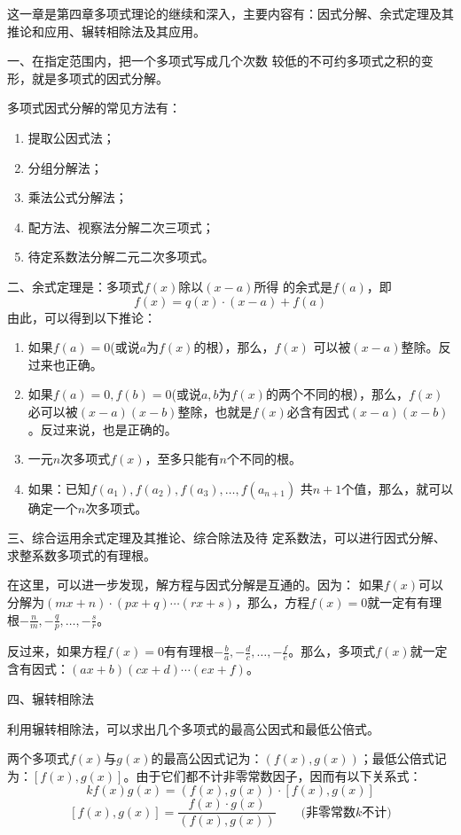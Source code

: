 这一章是第四章多项式理论的继续和深入，主要内容有：因式分解、余式定理及其推论和应用、辗转相除法及其应用。

一、在指定范围内，把一个多项式写成几个次数
较低的不可约多项式之积的变形，就是多项式的因式分解。

多项式因式分解的常见方法有：
\begin{enumerate}
    \item 提取公因式法；
    \item 分组分解法；
    \item 乘法公式分解法；
    \item 配方法、视察法分解二次三项式；
    \item 待定系数法分解二元二次多项式。
\end{enumerate} 

二、余式定理是：多项式$f(x)$除以$(x-a)$所得
的余式是$f(a)$，即
\[f (x) =q (x) \cdot (x-a) +f (a) \]
由此，可以得到以下推论：
\begin{enumerate}
\item 如果$f(a)=0$(或说$a$为$f(x)$的根），那么，$f(x)$
可以被$(x-a)$整除。反过来也正确。
\item 如果$f(a)=0,f(b)=0$(或说$a,b$为$f(x)$的两个不同的根），那么，$f(x)$必可以被$(x-a)(x-b)$整除，也就是$f(x)$必含有因式$(x-a)(x-b)$。反过来说，也是正确的。
\item 一元$n$次多项式$f(x)$，至多只能有$n$个不同的根。
\item  如果：已知$f(a_1),f(a_2),f(a_3),\ldots,f(a_{n+1})$
共$n+1$个值，那么，就可以确定一个$n$次多项式。
\end{enumerate}

三、综合运用余式定理及其推论、综合除法及待
定系数法，可以进行因式分解、求整系数多项式的有理根。

在这里，可以进一步发现，解方程与因式分解是互通的。因为：
如果$f(x)$可以分解为$(mx+n)\cdot (px+q)\cdots (rx+s)$，那么，方程$f(x)=0$就一定有有理根$-\frac{n}{m},-\frac{q}{p},\ldots,-\frac{s}{r}$。

反过来，如果方程$f(x)=0$有有理根$-\frac{b}{a},-\frac{d}{c},\ldots,-\frac{f}{e}$。那么，多项式$f(x)$就一定含有因式：$(ax+b)(cx+d)\cdots(ex+f)$。

四、辗转相除法

利用辗转相除法，可以求出几个多项式的最高公因式和最低公倍式。

两个多项式$f(x)$与$g(x)$的最高公因式记为：$(f(x),g(x))$；最低公倍式记为：$[f(x), g(x)]$。由于它们都不计非零常数因子，因而有以下关系式：
\[ kf (x) g (x) = (f(x), g(x))\cdot [f(x),g(x)]\]
\[[f(x),g(x)]=\frac{f(x)\cdot g(x)}{(f(x), g(x))}\qquad \text{(非零常数$k$不计)}\]



